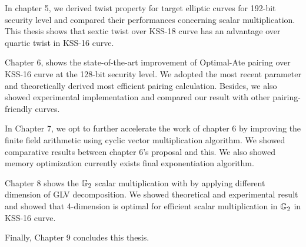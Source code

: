 In chapter 5, we derived twist property for target elliptic curves for 192-bit security level and compared their performances concerning scalar multiplication.
This thesis shows that sextic twist over KSS-18 curve has an advantage over quartic twist in KSS-16 curve.

Chapter 6, shows the state-of-the-art improvement of Optimal-Ate pairing over KSS-16 curve at the 128-bit security level.
We adopted the most recent parameter and theoretically derived most efficient pairing calculation.
Besides, we also showed experimental implementation and compared our result with other pairing-friendly curves.


In Chapter 7, we opt to further accelerate the work of chapter 6 by improving the finite field arithmetic using cyclic vector multiplication algorithm.
We showed comparative results between chapter 6's proposal and this. 
We also showed memory optimization currently exists final exponentiation algorithm.

Chapter 8 shows the   ${\mathbb{G}}_{2}$  scalar multiplication with by applying different dimension of GLV decomposition.
We showed theoretical and experimental result and showed that 4-dimension is optimal for efficient scalar multiplication in  ${\mathbb{G}}_{2}$ in KSS-16 curve.

Finally, Chapter 9 concludes this thesis.

	
